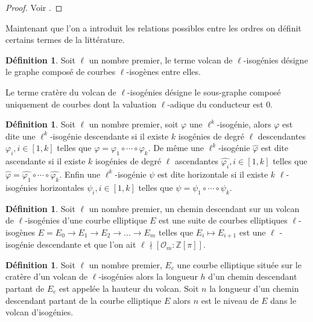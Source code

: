 \documentclass[10pt,a4paper]{book}
\theoremstyle{plain}
\theoremstyle{definition}
\theoremstyle{definition}
\theoremstyle{definition}
\theoremstyle{definition}
\newtheorem{defi}[thm]{Définition}
\theoremstyle{remark}
\theoremstyle{remark}
\theoremstyle{definition}
\begin{document}
\begin{proof}
Voir \cite[§2.3]{FouquetMorain02}.
\end{proof}

Maintenant que l'on a introduit les relations possibles entre les ordres on définit certains termes de la littérature.

\begin{defi}
Soit $\ell$ un nombre premier, le terme volcan de $\ell$-isogénies désigne le graphe composé de courbes $\ell$-isogènes entre elles.

Le terme cratère du volcan de $\ell$-isogénies désigne le sous-graphe composé uniquement de courbes dont la valuation $\ell$-adique du conducteur est $0$.
\end{defi}

\begin{defi}
Soit $\ell$ un nombre premier, soit $\varphi$ une $\ell^k$-isogénie, alors
$\varphi$ est dite une $\ell^k$-isogénie descendante si il existe $k$ 
isogénies de degré $\ell$ descendantes $\varphi_i, i \in [1,k]$ telles que 
$\varphi=\varphi_1 \circ \cdots \circ \varphi_k$. De même une 
$\ell^k$-isogénie $\widehat{\varphi}$ est dite ascendante si il existe $k$ 
isogénies de degré $\ell$ ascendantes $\widehat{\varphi_i}, i \in [1,k]$ 
telles que $\widehat{\varphi}=\widehat{\varphi_1} \circ \cdots \circ 
\widehat{\varphi_k}$. Enfin une $\ell^k$-isogénie $\psi$ est dite horizontale 
si il existe $k$ $\ell$-isogénies horizontales $\psi_i, i \in [1,k]$ telles 
que $\psi=\psi_1 \circ \cdots \circ \psi_k$.
\end{defi}

\begin{defi}
Soit $\ell$ un nombre premier, un chemin descendant sur un volcan de $\ell$-isogénies d'une courbe elliptique $E$ est une suite de courbes elliptiques $\ell$-isogènes $E=E_0 \rightarrow E_1 \rightarrow E_2 \rightarrow ... \rightarrow E_m$ telles que $E_i \mapsto E_{i+1}$ est une $\ell$ -isogénie descendante et que l'on ait $\ell \nmid [ \mathcal{O}_m : \mathbb{Z}[\pi]]$. 
\end{defi}

\begin{defi}
Soit $\ell$ un nombre premier, $E_c$ une courbe elliptique située sur le cratère d'un volcan de $\ell$-isogénies alors la longueur $h$ d'un chemin descendant partant de $E_c$ est appelée la hauteur du volcan.
Soit $n$ la longueur d'un chemin descendant partant de la courbe elliptique $E$ alors $n$ est le niveau de $E$ dans le volcan d'isogénies.
\end{defi}
\end{document}
